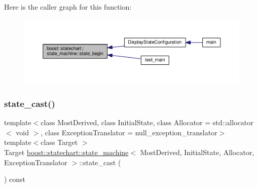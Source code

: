 Here is the caller graph for this function\+:
\nopagebreak
\begin{figure}[H]
\begin{center}
\leavevmode
\includegraphics[width=350pt]{classboost_1_1statechart_1_1state__machine_a270c21248c558be7daf8139c032b1f0c_icgraph}
\end{center}
\end{figure}
\mbox{\label{classboost_1_1statechart_1_1state__machine_aabd07005b47036311b5e80e05c1746c2}} 
\subsubsection{\texorpdfstring{state\+\_\+cast()}{state\_cast()}}
{\footnotesize\ttfamily template$<$class Most\+Derived, class Initial\+State, class Allocator = std\+::allocator$<$ void $>$, class Exception\+Translator = null\+\_\+exception\+\_\+translator$>$ \\
template$<$class Target $>$ \\
Target \mbox{\hyperlink{classboost_1_1statechart_1_1state__machine}{boost\+::statechart\+::state\+\_\+machine}}$<$ Most\+Derived, Initial\+State, Allocator, Exception\+Translator $>$\+::state\+\_\+cast (\begin{DoxyParamCaption}{ }\end{DoxyParamCaption}) const\hspace{0.3cm}{\ttfamily [inline]}}

